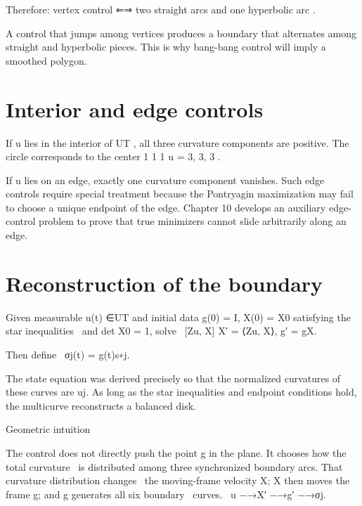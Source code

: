 Therefore: vertex control ⇐⇒ two straight arcs and one hyperbolic arc .


A control that jumps among vertices produces a boundary that alternates among straight and hyperbolic pieces. This is why bang-bang control will imply a smoothed polygon.


\section{Interior and edge controls}

If u lies in the interior of UT , all three curvature components are positive. The circle corresponds to the center 1 1 1 u = 3, 3, 3 .


If u lies on an edge, exactly one curvature component vanishes. Such edge controls require special treatment because the Pontryagin maximization may fail to choose a unique endpoint of the edge. Chapter 10 develops an auxiliary edge-control problem to prove that true minimizers cannot slide arbitrarily along an edge.


\section{Reconstruction of the boundary}

\begin{displaytext}
Given measurable u(t) ∈UT and initial data g(0) = I, X(0) = X0 satisfying the star inequalities \
and det X0 = 1, solve \
[Zu, X] X′ = ⟨Zu, X⟩, g′ = gX.
\end{displaytext}

\begin{displaytext}
Then define \
σj(t) = g(t)s∗j.
\end{displaytext}

The state equation was derived precisely so that the normalized curvatures of these curves are uj. As long as the star inequalities and endpoint conditions hold, the multicurve reconstructs a balanced disk.


\begin{insightbox}{Geometric intuition}
\end{insightbox}

\begin{displaytext}
The control does not directly push the point g in the plane. It chooses how the total curvature \
is distributed among three synchronized boundary arcs. That curvature distribution changes \
the moving-frame velocity X; X then moves the frame g; and g generates all six boundary \
curves. \
u −→X′ −→g′ −→σj.
\end{displaytext}

